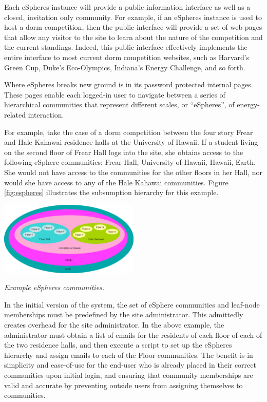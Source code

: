 Each eSpheres instance will provide a public information interface as well
as a closed, invitation only community.  For example, if an eSpheres
instance is used to host a dorm competition, then the public interface will
provide a set of web pages that allow any visitor to the site to learn
about the nature of the competition and the current standings.  Indeed,
this public interface effectively implements the entire interface to most
current dorm competition websites, such as Harvard's Green Cup, Duke's
Eco-Olympics, Indiana's Energy Challenge, and so forth. 

Where eSpheres breaks new ground is in its password protected internal
pages.  These pages enable each logged-in user to navigate between a series
of hierarchical communities that represent different scales, or
``eSpheres'', of energy-related interaction.

For example, take the case of a dorm competition between the four story
Frear and Hale Kahawai residence halls at the University of Hawaii. If a
student living on the second floor of Frear Hall logs into the site, she
obtains access to the following eSphere communities: Frear Hall, University
of Hawaii, Hawaii, Earth.  She would not have access to the communities for
the other floors in her Hall, nor would she have access to any of the Hale
Kahawai communities.  Figure \ref{fig:espheres} illustrates the subsumption
hierarchy for this example.

\begin{floatingfigure}[l]{3.25in}
 \center
  \includegraphics[width=0.5\textwidth]{espheres.eps}
  \caption{\em \small Example eSpheres communities.}
 \label{fig:espheres}
\end{floatingfigure} 

In the initial version of the system, the set of eSphere communities and
leaf-node memberships must be predefined by the site administrator. This
admittedly creates overhead for the site administrator. In the above
example, the administrator must obtain a list of emails for the residents
of each floor of each of the two residence halls, and then execute a script
to set up the eSpheres hierarchy and assign emails to each of the Floor
communities. The benefit is in simplicity and ease-of-use for the end-user
who is already placed in their correct communities upon initial login, 
and ensuring that community memberships are valid and accurate by
preventing outside users from assigning themselves to communities.

